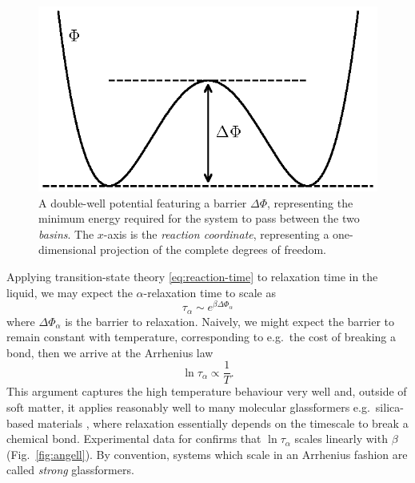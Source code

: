 \documentclass[11pt,twoside]{report}
\begin{document}
\begin{figure}
  \includegraphics[width=0.7\linewidth,center]{transition-state}
  \caption[Transition state theory]{
    A double-well potential featuring a barrier $\Delta\Phi$, representing the minimum energy required for the system to pass between the two \emph{basins}.
    The $x$-axis is the \emph{reaction coordinate}, representing a one-dimensional projection of the complete degrees of freedom.
  }
  \label{fig:transition-state}
\end{figure}

Applying transition-state theory \eqref{eq:reaction-time} to relaxation time in the liquid, we may expect the $\alpha$-relaxation time to scale as
\begin{equation}\label{eq:tau-barrier}
  \tau_\alpha \sim e^{\beta \Delta \Phi_\alpha}
\end{equation}
where $\Delta \Phi_\alpha$ is the barrier to relaxation.
Naively, we might expect the barrier to remain constant with temperature, corresponding to e.g.\ the cost of breaking a bond, then we arrive at the Arrhenius law
\begin{equation}\label{eq:arrhenius-law}
  \ln{\tau_\alpha} \propto \frac{1}{T}.
\end{equation}
This argument captures the high temperature behaviour very well and, outside of soft matter, it applies reasonably well to many molecular glassformers e.g.\ silica-based materials%
,
where relaxation essentially depends on the timescale to break a chemical bond.
Experimental data for  \cite{AngellS1995} confirms that $\ln{\tau_\alpha}$ scales linearly with $\beta$ (Fig.\ \ref{fig:angell}).
By convention, systems which scale in an Arrhenius fashion are called \emph{strong}%
glassformers.
\end{document}
